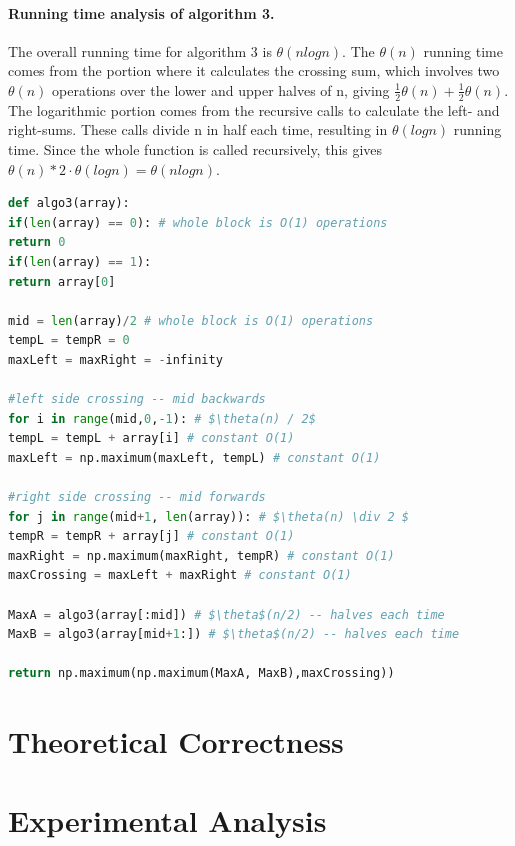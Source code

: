 \documentclass[a4paper,12pt]{article}
\begin{document}
\paragraph{Running time analysis of algorithm 3.} The overall running time for algorithm 3 is $\theta(n log n)$. The $\theta(n)$ running time comes from the portion where it calculates the crossing sum, which involves two $\theta(n)$ operations over the lower and upper halves of n, giving $ \frac{1}{2} \theta(n) + \frac{1}{2} \theta(n)$. The logarithmic portion comes from the recursive calls to calculate the left- and right-sums. These calls divide n in half each time, resulting in $\theta(log n)$ running time. Since the whole function is called recursively, this gives $ \theta(n) * 2 \cdot \theta(log n) = \theta(n log n)$.


  \begin{lstlisting}[language=python,caption={pseudo code for $n\log(n)$ algorithm},mathescape]
def algo3(array):
if(len(array) == 0): # whole block is O(1) operations
return 0
if(len(array) == 1):
return array[0]

mid = len(array)/2 # whole block is O(1) operations
tempL = tempR = 0
maxLeft = maxRight = -infinity

#left side crossing -- mid backwards
for i in range(mid,0,-1): # $\theta(n) / 2$
tempL = tempL + array[i] # constant O(1)
maxLeft = np.maximum(maxLeft, tempL) # constant O(1)

#right side crossing -- mid forwards
for j in range(mid+1, len(array)): # $\theta(n) \div 2 $
tempR = tempR + array[j] # constant O(1)
maxRight = np.maximum(maxRight, tempR) # constant O(1)
maxCrossing = maxLeft + maxRight # constant O(1)

MaxA = algo3(array[:mid]) # $\theta$(n/2) -- halves each time
MaxB = algo3(array[mid+1:]) # $\theta$(n/2) -- halves each time

return np.maximum(np.maximum(MaxA, MaxB),maxCrossing))
  \end{lstlisting}

\section*{Theoretical Correctness}

\section*{Experimental Analysis}
\end{document}
